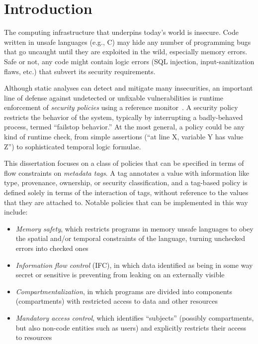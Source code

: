 \documentclass{report}
\begin{document}
\chapter{Introduction}

The computing infrastructure that underpins today's world is insecure. Code written
in unsafe languages (e.g., C) may hide any number of programming bugs that go uncaught
until they are exploited in the wild, especially memory errors. Safe or not, any code
might contain logic errors (SQL injection, input-sanitization flaws, etc.) that subvert
its security requirements.

Although static analyses can detect and mitigate many insecurities, an important line of
defense against undetected or unfixable vulnerabilities is runtime enforcement of
{\em security policies} using a reference monitor~\cite{Anderson72:PlanningStudy}.
A security policy restricts the behavior of the system, typically by interrupting
a badly-behaved process, termed ``failstop behavior.'' At the most general, a policy could be
any kind of runtime check, from simple assertions (``at line X, variable Y has value Z'') to
sophisticated temporal logic formulae.

This dissertation focuses on a class of policies that can be specified in terms of flow constraints
on \emph{metadata tags}. A tag annotates a value with information like type, provenance,
ownership, or security classification, and a tag-based policy is defined solely in terms of
the interaction of tags, without reference to the values that they are attached to.
Notable policies that can be implemented in this way include:

\begin{itemize}
\item {\em Memory safety}, which restricts programs in memory unsafe languages to obey
  the spatial and/or temporal constraints of the language, turning unchecked errors into
  checked ones
\item {\em Information flow control} (IFC), in which data identified as being in some way secret
  or sensitive is preventing from leaking on an externally visible
\item {\em Compartmentalization}, in which programs are divided into components (compartments)
  with restricted access to data and other resources
\item {\em Mandatory access control}, which identifies ``subjects'' (possibly compartments,
  but also non-code entities such as users) and explicitly restricts their access to resources
\end{itemize}
\end{document}
